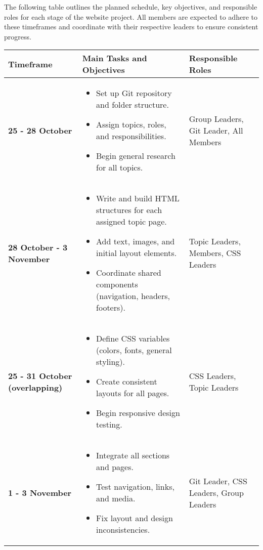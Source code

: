 \documentclass[a4paper,12pt]{article}
\begin{document}
\begin{itemize}[leftmargin=1.2cm]
\noindent
The following table outlines the planned schedule, key objectives, and responsible roles for each stage of the website project.  
All members are expected to adhere to these timeframes and coordinate with their respective leaders to ensure consistent progress.

\begin{center}
\renewcommand{\arraystretch}{1.3}
\begin{tabular}{|p{2.5cm}|p{8cm}|p{4cm}|}
\hline
\textbf{Timeframe} & \textbf{Main Tasks and Objectives} & \textbf{Responsible Roles} \\
\hline
\textbf{25 - 28 October} & 
\begin{itemize}[leftmargin=0.5cm]
    \item Set up Git repository and folder structure.
    \item Assign topics, roles, and responsibilities.
    \item Begin general research for all topics.
\end{itemize} & 
Group Leaders, Git Leader, All Members \\
\hline

\textbf{28 October - 3 November} & 
\begin{itemize}[leftmargin=0.5cm]
    \item Write and build HTML structures for each assigned topic page.
    \item Add text, images, and initial layout elements.
    \item Coordinate shared components (navigation, headers, footers).
\end{itemize} & 
Topic Leaders, Members, CSS Leaders \\
\hline

\textbf{25 - 31 October (overlapping)} & 
\begin{itemize}[leftmargin=0.5cm]
    \item Define CSS variables (colors, fonts, general styling).
    \item Create consistent layouts for all pages.
    \item Begin responsive design testing.
\end{itemize} & 
CSS Leaders, Topic Leaders \\
\hline

\textbf{1 - 3 November} & 
\begin{itemize}[leftmargin=0.5cm]
    \item Integrate all sections and pages.
    \item Test navigation, links, and media.
    \item Fix layout and design inconsistencies.
\end{itemize} & 
Git Leader, CSS Leaders, Group Leaders \\
\hline


\end{tabular}
\end{center}
\end{itemize}
\end{document}
